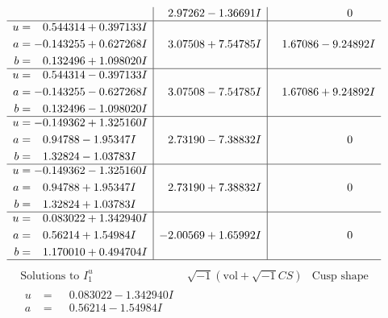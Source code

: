 \documentclass[1p]{elsarticle_modified}
\theoremstyle{definition}
\newcommand{\I}{\sqrt{-1}}
\begin{document}
$$\begin{array}{c|c|c}
 & \phantom{-}2.97262 - 1.36691 I & \phantom{-0.000000 } 0 \\ \hline\begin{aligned}
u &= \phantom{-}0.544314 + 0.397133 I \\
a &= -0.143255 + 0.627268 I \\
b &= \phantom{-}0.132496 + 1.098020 I\end{aligned}
 & \phantom{-}3.07508 + 7.54785 I & \phantom{-}1.67086 - 9.24892 I \\ \hline\begin{aligned}
u &= \phantom{-}0.544314 - 0.397133 I \\
a &= -0.143255 - 0.627268 I \\
b &= \phantom{-}0.132496 - 1.098020 I\end{aligned}
 & \phantom{-}3.07508 - 7.54785 I & \phantom{-}1.67086 + 9.24892 I \\ \hline\begin{aligned}
u &= -0.149362 + 1.325160 I \\
a &= \phantom{-}0.94788 - 1.95347 I \\
b &= \phantom{-}1.32824 - 1.03783 I\end{aligned}
 & \phantom{-}2.73190 - 7.38832 I & \phantom{-0.000000 } 0 \\ \hline\begin{aligned}
u &= -0.149362 - 1.325160 I \\
a &= \phantom{-}0.94788 + 1.95347 I \\
b &= \phantom{-}1.32824 + 1.03783 I\end{aligned}
 & \phantom{-}2.73190 + 7.38832 I & \phantom{-0.000000 } 0 \\ \hline\begin{aligned}
u &= \phantom{-}0.083022 + 1.342940 I \\
a &= \phantom{-}0.56214 + 1.54984 I \\
b &= \phantom{-}1.170010 + 0.494704 I\end{aligned}
 & -2.00569 + 1.65992 I & \phantom{-0.000000 } 0\\
 \hline 
 \end{array}$$\newpage$$\begin{array}{c|c|c}  
\text{Solutions to }I^u_{1}& \I (\text{vol} + \sqrt{-1}CS) & \text{Cusp shape}\\
 \hline 
\begin{aligned}
u &= \phantom{-}0.083022 - 1.342940 I \\
a &= \phantom{-}0.56214 - 1.54984 I \\

\end{aligned}
\end{array}$$
\end{document}
